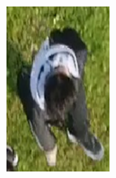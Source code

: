 \begin{figure}[h]
\begin{subfigure}[h]{0.11\textwidth}
        \includegraphics[width=\textwidth]{figures/样本标注示例7.png}
    \end{subfigure}
    ~ %
    \begin{subfigure}[h]{0.11\textwidth}

\end{subfigure}
\end{figure}
